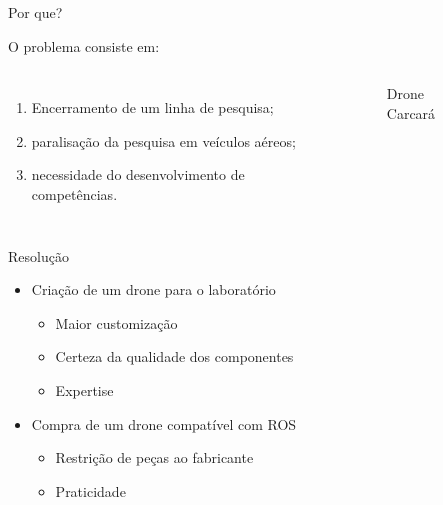 \begin{frame}[t]{Por que?}
    \transdissolve[duration=0.5]

    O problema consiste em:
    \begin{columns}[t]
        \begin{enumerate}
            \item Encerramento de um linha de pesquisa;
            \item paralisação da pesquisa em veículos aéreos;
            \item necessidade do desenvolvimento de competências.
        \end{enumerate}
        \begin{center}
            \begin{figure}
                \caption{Drone Carcará}
            \end{figure}
        \end{center}
    \end{columns}
\end{frame}
\begin{frame}[t]{Resolução}
  \transdissolve[duration=0.5]

  \begin{itemize}
    \Large
    \item Criação de um drone para o laboratório
    \begin{itemize}
      \large
      \item Maior customização
      \item Certeza da qualidade dos componentes
      \item Expertise
    \end{itemize}

    \item Compra de um drone compatível com ROS
    \begin{itemize}
      \large
      \item Restrição de peças ao fabricante
      \item Praticidade
    \end{itemize}

  \end{itemize}

\end{frame}

